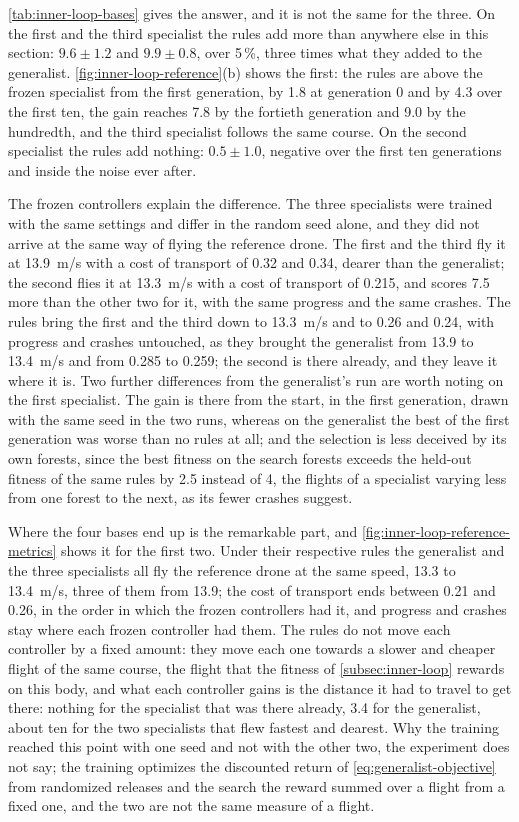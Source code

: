 \autoref{tab:inner-loop-bases} gives the answer, and it is not the same for the three. On the first and the third specialist the rules add more than anywhere else in this section: $9.6 \pm 1.2$ and $9.9 \pm 0.8$, over 5\,\%, three times what they added to the generalist. \autoref{fig:inner-loop-reference}(b) shows the first: the rules are above the frozen specialist from the first generation, by 1.8 at generation 0 and by 4.3 over the first ten, the gain reaches 7.8 by the fortieth generation and 9.0 by the hundredth, and the third specialist follows the same course. On the second specialist the rules add nothing: $0.5 \pm 1.0$, negative over the first ten generations and inside the noise ever after.

The frozen controllers explain the difference. The three specialists were trained with the same settings and differ in the random seed alone, and they did not arrive at the same way of flying the reference drone. The first and the third fly it at 13.9~m/s with a cost of transport of 0.32 and 0.34, dearer than the generalist; the second flies it at 13.3~m/s with a cost of transport of 0.215, and scores 7.5 more than the other two for it, with the same progress and the same crashes. The rules bring the first and the third down to 13.3~m/s and to 0.26 and 0.24, with progress and crashes untouched, as they brought the generalist from 13.9 to 13.4~m/s and from 0.285 to 0.259; the second is there already, and they leave it where it is. Two further differences from the generalist's run are worth noting on the first specialist. The gain is there from the start, in the first generation, drawn with the same seed in the two runs, whereas on the generalist the best of the first generation was worse than no rules at all; and the selection is less deceived by its own forests, since the best fitness on the search forests exceeds the held-out fitness of the same rules by 2.5 instead of 4, the flights of a specialist varying less from one forest to the next, as its fewer crashes suggest.

Where the four bases end up is the remarkable part, and \autoref{fig:inner-loop-reference-metrics} shows it for the first two. Under their respective rules the generalist and the three specialists all fly the reference drone at the same speed, 13.3 to 13.4~m/s, three of them from 13.9; the cost of transport ends between 0.21 and 0.26, in the order in which the frozen controllers had it, and progress and crashes stay where each frozen controller had them. The rules do not move each controller by a fixed amount: they move each one towards a slower and cheaper flight of the same course, the flight that the fitness of \autoref{subsec:inner-loop} rewards on this body, and what each controller gains is the distance it had to travel to get there: nothing for the specialist that was there already, 3.4 for the generalist, about ten for the two specialists that flew fastest and dearest. Why the training reached this point with one seed and not with the other two, the experiment does not say; the training optimizes the discounted return of \eqref{eq:generalist-objective} from randomized releases and the search the reward summed over a flight from a fixed one, and the two are not the same measure of a flight.

